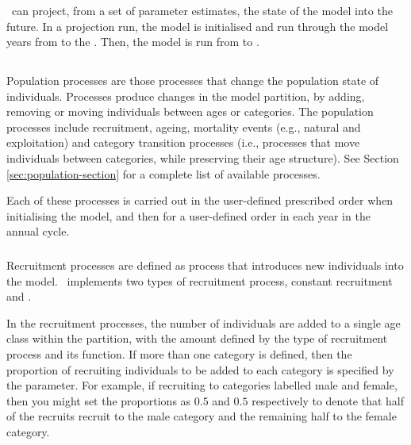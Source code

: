 \subsubsection{\label{sec:projections}}

\iSAM\ can project, from a set of parameter estimates, the state of the model into the future. In a projection run, the model is initialised and run through the model years from  to the . Then, the model is run from  to . 


\subsection{}

Population processes are those processes that change the population state of individuals. Processes produce changes in the model partition, by adding, removing or moving individuals between ages or categories. The population processes include recruitment, ageing,  mortality events (e.g., natural and exploitation) and category transition processes (i.e., processes that move individuals between categories, while preserving their age structure). See Section \ref{sec:population-section} for a complete list of available processes.

Each of these processes is carried out in the user-defined prescribed order when initialising the model, and then for a user-defined order in each year in the annual cycle.

\subsubsection{}

Recruitment processes are defined as  process that introduces new individuals into the model. \iSAM\ implements two types of recruitment process, constant recruitment and   \citep{1203}.

In the recruitment processes, the number of individuals are added to a single age class within the partition, with the amount defined by the type of recruitment process and its function. If more than one category is defined, then the proportion of recruiting individuals to be added to each category is specified by the  parameter. For example, if recruiting to categories labelled male and female, then you might set the proportions as $0.5$ and $0.5$ respectively to denote that half of the recruits recruit to the male category and the remaining half to the female category.

